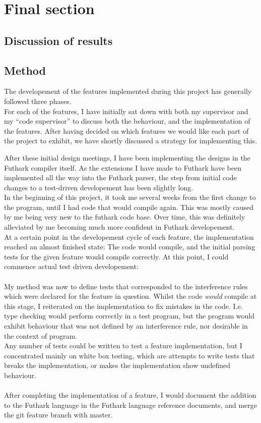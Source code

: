 \section{Final section}
\label{sec:final_section}

\subsection{Discussion of results}
\label{subsec:label}

\subsection{Method}
\label{subsec:method}
The developement of the features implemented during this project has generally
followed three phases.\\
For each of the features, I have initially sat down with both my supervisor and
my ``code supervisor'' to discuss both the behaviour, and the implementation of
the features. After having decided on which features we would like each part of
the project to exhibit, we have shortly discussed a strategy for implementing
this.

After these initial design meetings, I have been implementing the designs in the
Futhark compiler itself. As the extensions I have made to Futhark have been
implemented all the way into the Futhark parser, the step from initial code
changes to a test-driven developement has been slightly long.
\\
In the beginning of this project, it took me several weeks from the first change to the program, until
I had code that would compile again. This was mostly caused by me being very
new to the futhark code base. Over time, this was definitely alleviated by me
becoming much more confident in Futhark developement.
\\
At a certain point in the developement cycle of each feature, the implementation
reached an almost finished state: The code would compile, and the initial
parsing tests for the given feature would compile correctly. At this point, I
could commence actual test driven developement:
\\
\\
My method was now to define tests that corresponded to the interference rules
which were declared for the feature in question. Whilst the code \textit{would}
compile at this stage, I reiterated on the implementation to fix mistakes in the
code.
I.e. type checking would perform correctly in a test program, but the program
would exhibit behaviour that was not defined by an interference rule, nor
desirable in the context of program.
\\
Any number of tests could be written to test a feature implementation, but I
concentrated mainly on white box testing, which are attempts to write tests that
breaks the implementation, or makes the implementation show undefined behaviour.
\\
\\
After completing the implementation of a feature, I would document the addition
to the Futhark language in the Futhark language reference documents, and merge
the git feature branch with master.

